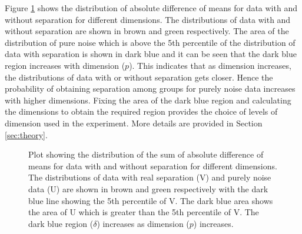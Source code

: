 Figure \ref{fig:dimen} shows the distribution of absolute difference of means for data with and without separation for different dimensions. The distributions of data with and without separation are shown in brown and green respectively. The area of the distribution of pure noise which is above the 5th percentile of the distribution of data with separation is shown in dark blue and it can be seen that the dark blue region increases with dimension ($p$). This indicates that as dimension increases, the distributions of data with or without separation gets closer. Hence the probability of obtaining separation among groups for purely noise data increases with higher dimensions. Fixing the area of the dark blue region and calculating the dimensions to obtain the required region provides the choice of levels of dimension used in the experiment. More details are provided in Section \ref{sec:theory}. 

\begin{figure}[hbtp]
   \centering
       \caption{Plot showing the distribution of the sum of absolute difference of means for data with and without separation for different dimensions. The distributions of data with real separation (V) and purely noise data (U) are shown in brown and green respectively with the dark blue line showing the 5th percentile of V. The dark blue area shows the area of U which is greater than the 5th percentile of V. The dark blue region ($\delta$) increases as dimension ($p$) increases. }
     \label{fig:dimen}
\end{figure}

